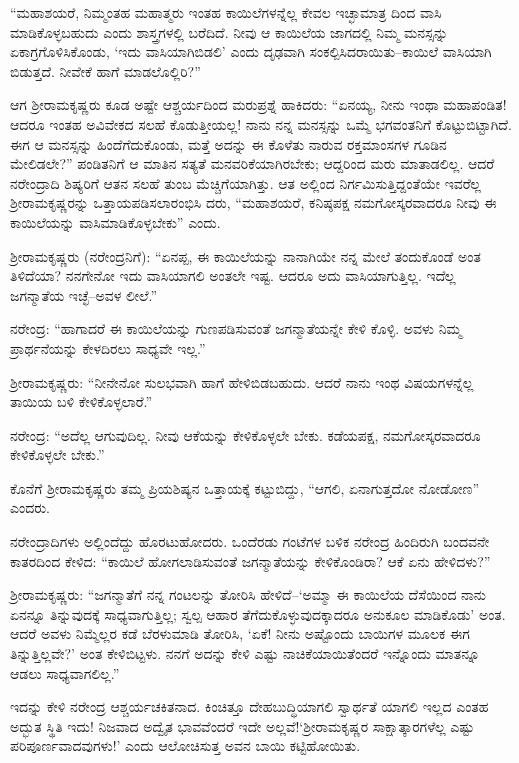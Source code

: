 “ಮಹಾಶಯರೆ, ನಿಮ್ಮಂತಹ ಮಹಾತ್ಮರು ಇಂತಹ ಕಾಯಿಲೆಗಳನ್ನೆಲ್ಲ ಕೇವಲ ಇಚ್ಛಾಮಾತ್ರ ದಿಂದ ವಾಸಿ ಮಾಡಿಕೊಳ್ಳಬಹುದು ಎಂದು ಶಾಸ್ತ್ರಗಳಲ್ಲಿ ಬರೆದಿದೆ. ನೀವು ಆ ಕಾಯಿಲೆಯ ಜಾಗದಲ್ಲಿ ನಿಮ್ಮ ಮನಸ್ಸನ್ನು ಏಕಾಗ್ರಗೊಳಿಸಿಕೊಂಡು, ‘ಇದು ವಾಸಿಯಾಗಿಬಿಡಲಿ’ ಎಂದು ದೃಢವಾಗಿ ಸಂಕಲ್ಪಿಸಿದರಾಯಿತು–ಕಾಯಿಲೆ ವಾಸಿಯಾಗಿ ಬಿಡುತ್ತದೆ. ನೀವೇಕೆ ಹಾಗೆ ಮಾಡಲೊಲ್ಲಿರಿ?”

ಆಗ ಶ್ರೀರಾಮಕೃಷ್ಣರು ಕೂಡ ಅಷ್ಟೇ ಆಶ್ಚರ್ಯದಿಂದ ಮರುಪ್ರಶ್ನೆ ಹಾಕಿದರು: “ಏನಯ್ಯ, ನೀನು ಇಂಥಾ ಮಹಾಪಂಡಿತ! ಆದರೂ ಇಂತಹ ಅವಿವೇಕದ ಸಲಹೆ ಕೊಡುತ್ತೀಯಲ್ಲ! ನಾನು ನನ್ನ ಮನಸ್ಸನ್ನು ಒಮ್ಮೆ ಭಗವಂತನಿಗೆ ಕೊಟ್ಟುಬಿಟ್ಟಾಗಿದೆ. ಈಗ ಆ ಮನಸ್ಸನ್ನು ಹಿಂದೆಗೆದುಕೊಂಡು, ಮತ್ತೆ ಅದನ್ನು ಈ ಕೊಳೆತು ನಾರುವ ರಕ್ತಮಾಂಸಗಳ ಗೂಡಿನ ಮೇಲಿಡಲೇ?” ಪಂಡಿತನಿಗೆ ಆ ಮಾತಿನ ಸತ್ಯತೆ ಮನವರಿಕೆಯಾಗಿರಬೇಕು; ಆದ್ದರಿಂದ ಮರು ಮಾತಾಡಲಿಲ್ಲ. ಆದರೆ ನರೇಂದ್ರಾದಿ ಶಿಷ್ಯರಿಗೆ ಆತನ ಸಲಹೆ ತುಂಬ ಮೆಚ್ಚಿಗೆಯಾಗಿತ್ತು. ಆತ ಅಲ್ಲಿಂದ ನಿರ್ಗಮಿಸುತ್ತಿದ್ದಂತೆಯೇ ಇವರೆಲ್ಲ ಶ್ರೀರಾಮಕೃಷ್ಣರನ್ನು ಒತ್ತಾಯಪಡಿಸಲಾರಂಭಿಸಿ ದರು, “ಮಹಾಶಯರೆ, ಕನಿಷ್ಠಪಕ್ಷ ನಮಗೋಸ್ಕರವಾದರೂ ನೀವು ಈ ಕಾಯಿಲೆಯನ್ನು ವಾಸಿಮಾಡಿಕೊಳ್ಳಬೇಕು” ಎಂದು. 

ಶ್ರೀರಾಮಕೃಷ್ಣರು (ನರೇಂದ್ರನಿಗೆ): “ಏನಪ್ಪ, ಈ ಕಾಯಿಲೆಯನ್ನು ನಾನಾಗಿಯೇ ನನ್ನ ಮೇಲೆ ತಂದುಕೊಂಡೆ ಅಂತ ತಿಳಿದೆಯಾ? ನನಗೇನೋ ಇದು ವಾಸಿಯಾಗಲಿ ಅಂತಲೇ ಇಷ್ಟ. ಆದರೂ ಅದು ವಾಸಿಯಾಗುತ್ತಿಲ್ಲ. ಇದೆಲ್ಲ ಜಗನ್ಮಾತೆಯ ಇಚ್ಛೆ–ಅವಳ ಲೀಲೆ.”

ನರೇಂದ್ರ: “ಹಾಗಾದರೆ ಈ ಕಾಯಿಲೆಯನ್ನು ಗುಣಪಡಿಸುವಂತೆ ಜಗನ್ಮಾತೆಯನ್ನೇ ಕೇಳಿ ಕೊಳ್ಳಿ. ಅವಳು ನಿಮ್ಮ ಪ್ರಾರ್ಥನೆಯನ್ನು ಕೇಳದಿರಲು ಸಾಧ್ಯವೇ ಇಲ್ಲ.”

ಶ್ರೀರಾಮಕೃಷ್ಣರು: “ನೀನೇನೋ ಸುಲಭವಾಗಿ ಹಾಗೆ ಹೇಳಿಬಿಡಬಹುದು. ಆದರೆ ನಾನು ಇಂಥ ವಿಷಯಗಳನ್ನೆಲ್ಲ ತಾಯಿಯ ಬಳಿ ಕೇಳಿಕೊಳ್ಳಲಾರೆ.”

ನರೇಂದ್ರ: “ಅದೆಲ್ಲ ಆಗುವುದಿಲ್ಲ. ನೀವು ಆಕೆಯನ್ನು ಕೇಳಿಕೊಳ್ಳಲೇ ಬೇಕು. ಕಡೆಯಪಕ್ಷ, ನಮಗೋಸ್ಕರವಾದರೂ ಕೇಳಿಕೊಳ್ಳಲೇ ಬೇಕು.”

ಕೊನೆಗೆ ಶ್ರೀರಾಮಕೃಷ್ಣರು ತಮ್ಮ ಪ್ರಿಯಶಿಷ್ಯನ ಒತ್ತಾಯಕ್ಕೆ ಕಟ್ಟುಬಿದ್ದು, “ಆಗಲಿ, ಏನಾಗುತ್ತದೋ ನೋಡೋಣ” ಎಂದರು.

ನರೇಂದ್ರಾದಿಗಳು ಅಲ್ಲಿಂದೆದ್ದು ಹೊರಟುಹೋದರು. ಒಂದೆರಡು ಗಂಟೆಗಳ ಬಳಿಕ ನರೇಂದ್ರ ಹಿಂದಿರುಗಿ ಬಂದವನೇ ಕಾತರದಿಂದ ಕೇಳಿದ: “ಕಾಯಿಲೆ ಹೋಗಲಾಡಿಸುವಂತೆ ಜಗನ್ಮಾತೆಯನ್ನು ಕೇಳಿಕೊಂಡಿರಾ? ಆಕೆ ಏನು ಹೇಳಿದಳು?”

ಶ್ರೀರಾಮಕೃಷ್ಣರು: “ಜಗನ್ಮಾತೆಗೆ ನನ್ನ ಗಂಟಲನ್ನು ತೋರಿಸಿ ಹೇಳಿದೆ–‘ಅಮ್ಮಾ ಈ ಕಾಯಿಲೆಯ ದೆಸೆಯಿಂದ ನಾನು ಏನನ್ನೂ ತಿನ್ನುವುದಕ್ಕೆ ಸಾಧ್ಯವಾಗುತ್ತಿಲ್ಲ; ಸ್ವಲ್ಪ ಆಹಾರ ತೆಗೆದುಕೊಳ್ಳುವುದಕ್ಕಾದರೂ ಅನುಕೂಲ ಮಾಡಿಕೊಡು’ ಅಂತ. ಆದರೆ ಅವಳು ನಿಮ್ಮೆಲ್ಲರ ಕಡೆ ಬೆರಳುಮಾಡಿ ತೋರಿಸಿ, ‘ಏಕೆ! ನೀನು ಅಷ್ಟೊಂದು ಬಾಯಿಗಳ ಮೂಲಕ ಈಗ ತಿನ್ನುತ್ತಿಲ್ಲವೇ?’ ಅಂತ ಕೇಳಿಬಿಟ್ಟಳು. ನನಗೆ ಅದನ್ನು ಕೇಳಿ ಎಷ್ಟು ನಾಚಿಕೆಯಾಯಿತೆಂದರೆ ಇನ್ನೊಂದು ಮಾತನ್ನೂ ಆಡಲು ಸಾಧ್ಯವಾಗಲಿಲ್ಲ.”

ಇದನ್ನು ಕೇಳಿ ನರೇಂದ್ರ ಆಶ್ಚರ್ಯಚಕಿತನಾದ. ಕಿಂಚಿತ್ತೂ ದೇಹಬುದ್ಧಿಯಾಗಲಿ ಸ್ವಾರ್ಥತೆ ಯಾಗಲಿ ಇಲ್ಲದ ಎಂತಹ ಅದ್ಭುತ ಸ್ಥಿತಿ ಇದು! ನಿಜವಾದ ಅದ್ವೈತ ಭಾವವೆಂದರೆ ಇದೇ ಅಲ್ಲವೆ!‘ಶ್ರೀರಾಮಕೃಷ್ಣರ ಸಾಕ್ಷಾತ್ಕಾರಗಳೆಲ್ಲ ಎಷ್ಟು ಪರಿಪೂರ್ಣವಾದವುಗಳು!’ ಎಂದು ಆಲೋಚಿಸುತ್ತ ಅವನ ಬಾಯಿ ಕಟ್ಟಿಹೋಯಿತು.

